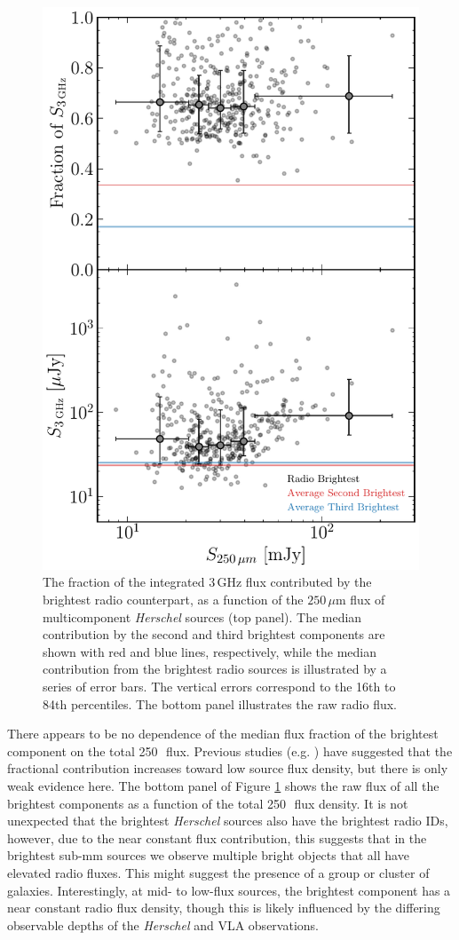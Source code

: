 \begin{figure}
	\centering
	\includegraphics[width=0.75\columnwidth]{Figures/multiples_flux_contribution.pdf}
	\caption{The fraction of the integrated $3\,$GHz flux contributed by the brightest radio counterpart, as a function of the $250\,\mu$m flux of multicomponent \textit{Herschel} sources (top panel). The median contribution by the second and third brightest components are shown with red and blue lines, respectively, while the median contribution from the brightest radio sources is illustrated by a series of error bars. The vertical errors correspond to the 16th to 84th percentiles. The bottom panel illustrates the raw radio flux.}
	\label{fig:multiples_flux_contribution}
\end{figure}

There appears to be no dependence of the median flux fraction of the brightest component on the total 250\,\micron\ flux. Previous studies (e.g. \citealt{Scudder_2016}) have suggested that the fractional contribution increases toward low source flux density, but there is only weak evidence here. The bottom panel of Figure \ref{fig:multiples_flux_contribution} shows the raw flux of all the brightest components as a function of the total 250\,\micron\ flux density. It is not unexpected that the brightest \textit{Herschel} sources also have the brightest radio IDs, however, due to the near constant flux contribution, this suggests that in the brightest sub-mm sources we observe multiple bright objects that all have elevated radio fluxes. This might suggest the presence of a group or cluster of galaxies. Interestingly, at mid- to low-flux sources, the brightest component has a near constant radio flux density, though this is likely influenced by the differing observable depths of the \textit{Herschel} and VLA observations.

